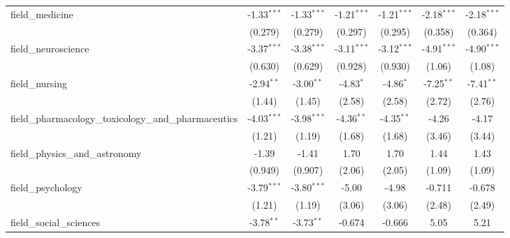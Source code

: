 \begin{tabular}{lcccccc}
   field\_medicine                                             & -1.33$^{***}$  & -1.33$^{***}$  & -1.21$^{***}$ & -1.21$^{***}$ & -2.18$^{***}$  & -2.18$^{***}$\\   
                                                               & (0.279)        & (0.279)        & (0.297)       & (0.295)       & (0.358)        & (0.364)\\   
   field\_neuroscience                                         & -3.37$^{***}$  & -3.38$^{***}$  & -3.11$^{***}$ & -3.12$^{***}$ & -4.91$^{***}$  & -4.90$^{***}$\\   
                                                               & (0.630)        & (0.629)        & (0.928)       & (0.930)       & (1.06)         & (1.08)\\   
   field\_nursing                                              & -2.94$^{**}$   & -3.00$^{**}$   & -4.83$^{*}$   & -4.86$^{*}$   & -7.25$^{**}$   & -7.41$^{**}$\\   
                                                               & (1.44)         & (1.45)         & (2.58)        & (2.58)        & (2.72)         & (2.76)\\   
   field\_pharmacology\_toxicology\_and\_pharmaceutics         & -4.03$^{***}$  & -3.98$^{***}$  & -4.36$^{**}$  & -4.35$^{**}$  & -4.26          & -4.17\\   
                                                               & (1.21)         & (1.19)         & (1.68)        & (1.68)        & (3.46)         & (3.44)\\   
   field\_physics\_and\_astronomy                              & -1.39          & -1.41          & 1.70          & 1.70          & 1.44           & 1.43\\   
                                                               & (0.949)        & (0.907)        & (2.06)        & (2.05)        & (1.09)         & (1.09)\\   
   field\_psychology                                           & -3.79$^{***}$  & -3.80$^{***}$  & -5.00         & -4.98         & -0.711         & -0.678\\   
                                                               & (1.21)         & (1.19)         & (3.06)        & (3.06)        & (2.48)         & (2.49)\\   
   field\_social\_sciences                                     & -3.78$^{**}$   & -3.73$^{**}$   & -0.674        & -0.666        & 5.05           & 5.21\\   

\end{tabular}
